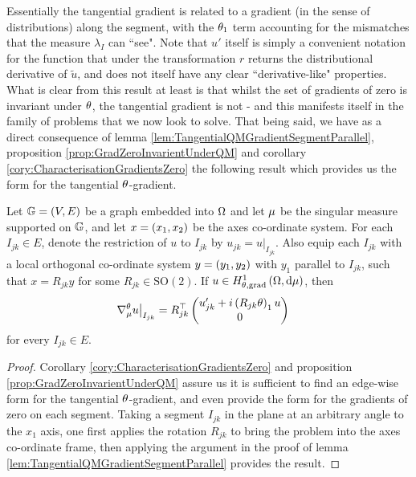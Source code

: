 Essentially the tangential gradient is related to a gradient (in the sense of distributions) along the segment, with the $\theta_1$ term accounting for the mismatches that the measure $\lambda_I$ can ``see".
Note that $u'$ itself is simply a convenient notation for the function that under the transformation $r$ returns the distributional derivative of $\widetilde{u}$, and does not itself have any clear ``derivative-like" properties.
What is clear from this result at least is that whilst the set of gradients of zero is invariant under $\theta$, the tangential gradient is not - and this manifests itself in the family of problems that we now look to solve.
That being said, we have as a direct consequence of lemma \ref{lem:TangentialQMGradientSegmentParallel}, proposition \ref{prop:GradZeroInvarientUnderQM} and corollary \ref{cory:CharacterisationGradientsZero} the following result which provides us the form for the tangential $\theta$-gradient.

\begin{cory}
	Let $\mathbb{G}=(V,E)$ be a graph embedded into $\Omega$ and let $\mu$ be the singular measure supported on $\mathbb{G}$, and let $x=\left( x_1,x_2 \right)$ be the axes co-ordinate system.
	For each $I_{jk}\in E$, denote the restriction of $u$ to $I_{jk}$ by $u_{jk} = u\vert_{I_{jk}}$.
	Also equip each $I_{jk}$ with a local orthogonal co-ordinate system $y=\left( y_1,y_2 \right)$ with $y_1$ parallel to $I_{jk}$, such that $x = R_{jk}y$ for some $R_{jk}\in\mathrm{SO}(2)$.
	If $u\in H^1_{\theta, \mathrm{grad}}\left( \Omega, \mathrm{d}\mu \right)$, then
	\begin{align*}
		\nabla_\mu^\theta u \big\vert_{I_{jk}} &= R_{jk}^\top \begin{pmatrix} u_{jk}' + i\left( R_{jk}\theta \right)_1 u \\ 0 \end{pmatrix}
	\end{align*}
	for every $I_{jk}\in E$.
\end{cory}
\begin{proof}
	Corollary \ref{cory:CharacterisationGradientsZero} and proposition \ref{prop:GradZeroInvarientUnderQM} assure us it is sufficient to find an edge-wise form for the tangential $\theta$-gradient, and even provide the form for the gradients of zero on each segment.
	Taking a segment $I_{jk}$ in the plane at an arbitrary angle to the $x_1$ axis, one first applies the rotation $R_{jk}$ to bring the problem into the axes co-ordinate frame, then applying the argument in the proof of lemma \ref{lem:TangentialQMGradientSegmentParallel} provides the result.
\end{proof}


